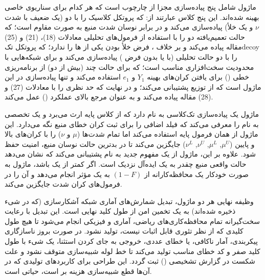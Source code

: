 ماژول  شامل پنج پیاده‌سازی مجزا از چارچوب  است که هر کدام برای سناریوی خاصی بهینه شده‌اند. این پنج کلاس عبارتند از:  که پروتکل کلاسیک  را با دو  (یک  ضعیف با شدت $\nu$ و یک  خلأ) پیاده‌سازی می‌کند و در برابر نوسان شدت منبع به صورت  مقاوم است؛  که حالت تعمیم‌یافته دو  را با استفاده از فرمول‌های تحلیلی معادلات (18)، (21) و (25) مقاله پیاده می‌کند و بر خلاف ، فرض خلأ بودن یکی از ‌ها را ندارد؛  که پروتکل تک‌‌‌decoy را با دو حالت تحلیلی (با یا بدون فرض ) پیاده‌سازی می‌کند و برای شبکه‌هایی با محدودیت سخت‌افزاری مناسب است؛  که برای حالت چند  (بیش از دو) از برنامه‌ریزی خطی () برای یافتن کران‌های بهینه $Y_1$ و $e_1$ استفاده می‌کند و تنها پیاده‌سازی در این ماژول است که از توزیع  پشتیبانی می‌کند؛ و در نهایت  که حد نظری  را با معادلات (27) و (28) مقاله پیاده می‌کند و به عنوان مرجع بالای عملکرد () عمل می‌کند.

ماژول  یک پیاده‌سازی تک‌کلاسی به نام  دارد که از کلاس پایه  ارث می‌برد و یک  تخصصی به نام  را معرفی می‌کند که فیلد اضافی  را برای ثبت کران خطای منبع نگه می‌دارد. این ماژول از همان فرمول پایه  استفاده می‌کند اما تمام شدت‌ها ($\mu$ و $\nu$) را با کران‌های بالا و پایین ($\mu^U$, $\mu^L$, $\nu^U$, $\nu^L$) جایگزین می‌کند تا در بدترین حالت نوسان منبع، امنیت حفظ شود. علاوه بر این، ماژول  از یک مفهوم جدید به نام  پشتیبانی می‌کند که نشان می‌دهد حالت واقعی منبع چقدر به یک  ایده‌آل نزدیک است. اگر  کمتر از یک باشد، ماژول به صورت خودکار یک  محافظه‌کارانه از $(1 - F)$ به یک  مؤثر انجام می‌دهد و آن را در فرمول‌های کران شدت جایگزین می‌کند.

وظیفه نهایی هر دو ماژول، تبدیل شمارش‌های آماری شبکه آشکارسازی (که در شیء  ذخیره شده‌اند) به یک تخمین امن از طول کلید نهایی است. این تبدیل با رعایت سخت‌گیرانه تمام محافظه‌کاری‌های ریاضی، آماری و فیزیکی انجام می‌شود تا هیچ طول کلیدی که از نظر تئوری قابل اثبات نیست، تولید نشود. در صورت بروز ناسازگاری پیکربندی، آمار ناکافی، یا خطای عددی، خروجی به جای  کردن استثنا، یک شیء  با طول کلید صفر و کد خطای مناسب تولید می‌کند تا خط لوله شبیه‌سازی متوقف نشود و علت شکست در گزارش تشخیصی () ثبت گردد. این طراحی  برای کاربردهای تولیدی که در آن‌ها قطع شبیه‌سازی هزینه بر است، حیاتی است.

